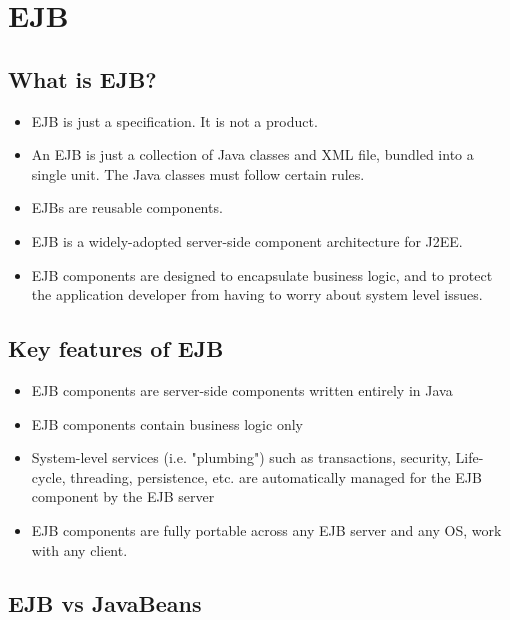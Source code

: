 \chapter{EJB}
\label{EJB}
\thispagestyle{chapternohead}

	
\pagestyle{ruledfilip}

\section{What is EJB?}

\begin{itemize}
	\item EJB is just a specification. It is not a product.
	\item An EJB is just a collection of Java classes and XML file,
	bundled into a single unit. The Java classes must follow
	certain rules.
	\item EJBs are reusable components.
	\item EJB is a widely-adopted server-side component architecture
	for J2EE.
	\item EJB components are designed to encapsulate business logic,
	and to protect the application developer from having to
	worry about system level issues.
\end{itemize}

\section{Key features of EJB}

\begin{itemize}
	\item EJB components are server-side components written entirely in Java
	\item EJB components contain business logic only
	\item System-level services (i.e. "plumbing") such as transactions,
	security, Life-cycle, threading, persistence, etc. are
	automatically managed for the EJB component by the EJB
	server
	\item EJB components are fully portable across any EJB server
	and any OS, work with any client.
\end{itemize}

\section{EJB vs JavaBeans}

